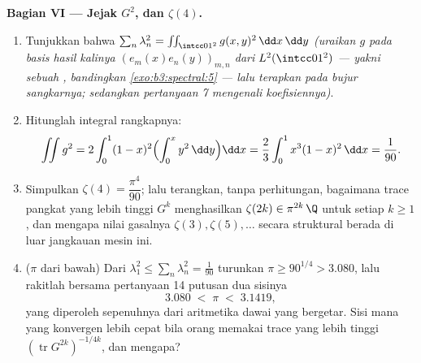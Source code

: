 \begin{problem}
\medskip
\noindent\textbf{Bagian VI --- Jejak $G^2$, dan
$\zeta(4)$.}
\begin{enumerate}[resume]
  \item Tunjukkan bahwa $\sum_n\lambda_n^2 =
        \iint_{\intcc01^2}g(x,y)^2\,\dd x\,\dd y$
        \emph{(uraikan $g$ pada basis hasil kalinya
        $(e_m(x)e_n(y))_{m,n}$ dari $L^2(\intcc01^2)$ --- yakni
        sebuah , bandingkan \cref{exo:b3:spectral:5} --- lalu
        terapkan  pada bujur sangkarnya; sedangkan pertanyaan 7 mengenali
        koefisiennya)}.
  \item Hitunglah integral rangkapnya:
        \[
        \iint g^2 = 2\int_0^1(1-x)^2\Bigl(\int_0^x
        y^2\,\dd y\Bigr)\dd x
        = \frac23\int_0^1x^3(1-x)^2\,\dd x = \frac1{90} .
        \]
  \item Simpulkan $\zeta(4) = \dfrac{\pi^4}{90}$; lalu terangkan,
        tanpa perhitungan, bagaimana trace pangkat yang lebih tinggi
        $G^k$ menghasilkan $\zeta(2k) \in \pi^{2k}\,\Q$ untuk setiap
        $k \geq 1$, dan mengapa nilai gasalnya $\zeta(3),
        \zeta(5), \dots$ secara struktural berada di luar
        jangkauan mesin ini.
  \item ($\pi$ dari bawah) Dari $\lambda_1^2 \leq
        \sum_n\lambda_n^2 = \frac1{90}$ turunkan $\pi \geq
        90^{1/4} > 3.080$, lalu rakitlah bersama pertanyaan 14
        putusan dua sisinya
        \[
        3.080 \;<\; \pi \;<\; 3.1419,
        \]
        yang diperoleh sepenuhnya dari aritmetika dawai yang
        bergetar. Sisi mana yang konvergen lebih cepat bila orang memakai
        trace yang lebih tinggi $(\operatorname{tr}G^{2k})^{-1/4k}$,
        dan mengapa?
\end{enumerate}


\end{problem}

